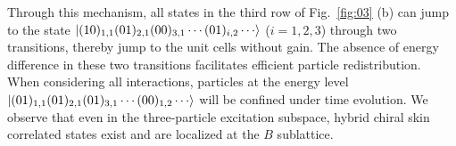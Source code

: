\documentclass[longbibliography, aps, prx, amsmath, amssymb, amsfonts, twocolumn,superscriptaddress, footinbib]{revtex4-1}
\begin{document}
	Through this mechanism, all states in the third row of Fig.~\ref{fig:03} (b) can jump to the state 
	$\ket{(10)_{1,1}(01)_{2,1}(00)_{3,1}\cdots(01)_{i,2}\cdots}$ ($i=1,2,3$) 
	through two transitions, thereby jump to the unit cells without gain. 
	The absence of energy difference in these two transitions facilitates efficient particle redistribution.
	When considering all interactions, particles at the energy level $\ket{(01)_{1,1}(01)_{2,1}(01)_{3,1}\cdots(00)_{1,2}\cdots}$ will be confined under time evolution.
	We observe that even in the three-particle excitation subspace, hybrid chiral skin correlated states exist and are localized at the $B$ sublattice. 

	
\end{document}
